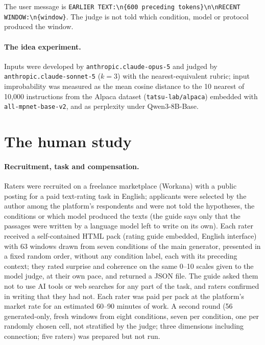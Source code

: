 \noindent The user message is \texttt{EARLIER TEXT:\textbackslash n\{600 preceding
tokens\}\textbackslash n\textbackslash nRECENT WINDOW:\textbackslash n\{window\}}.
The judge is not told which condition, model or protocol produced the window.

\paragraph{The idea experiment.} Inputs were developed by
\texttt{anthropic.claude-opus-5} and judged by \texttt{anthropic.claude-sonnet-5}
($k=3$) with the nearest-equivalent rubric; input improbability was measured
as the mean cosine distance to the 10 nearest of 10,000 instructions from the
Alpaca dataset (\texttt{tatsu-lab/alpaca}) embedded with
\texttt{all-mpnet-base-v2}, and as perplexity under Qwen3-8B-Base.

\section{The human study}
\label{app:human}

\paragraph{Recruitment, task and compensation.} Raters were recruited on a
freelance marketplace (Workana) with a public posting for a paid text-rating
task in English; applicants were selected by the author among the platform's
respondents and were not told the hypotheses, the conditions or which model
produced the texts (the guide says only that the passages were written by a
language model left to write on its own). Each rater received a self-contained HTML
pack (rating guide embedded, English interface) with 63 windows drawn from
seven conditions of the main generator, presented in a fixed random order,
without any condition label, each with its preceding context; they rated
surprise and coherence on the same 0--10 scales given to the model judge, at
their own pace, and returned a JSON file. The guide asked them not to use AI
tools or web searches for any part of the task, and raters confirmed in
writing that they had not. Each rater was paid per pack at the platform's
market rate for an estimated 60--90 minutes of work. A second round (56
generated-only, fresh windows from eight conditions, seven per condition,
one per randomly chosen cell, not stratified by the judge; three dimensions
including connection; five raters) was prepared but not run.

